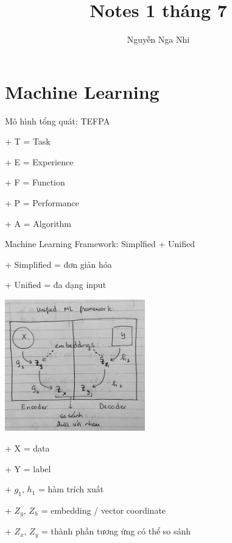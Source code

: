 \documentclass{article}
\title{Notes 1 tháng 7}
\author{Nguyễn Nga Nhi}
\begin{document}
\maketitle

\section{Machine Learning}

Mô hình tổng quát: TEFPA

+ T = Task

+ E = Experience

+ F = Function

+ P = Performance

+ A = Algorithm

Machine Learning Framework: Simplfied + Unified

+ Simplified = đơn giản hóa

+ Unified = đa dạng input

\includegraphics[width=230]{Unified ML Framework.jpg}

+ X = data

+ Y = label

+ $g_1$, $h_1$ = hàm trích xuất

+ $Z_g$, $Z_h$ = embedding / vector coordinate

+ $Z_x$, $Z_y$ = thành phần tương ứng có thể so sánh
\end{document}
